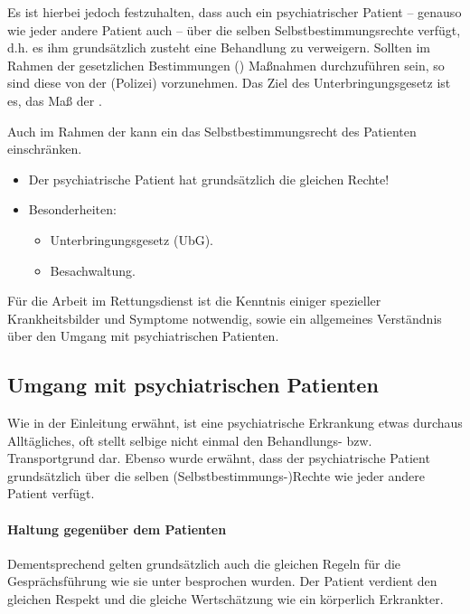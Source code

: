 {%
Es ist hierbei jedoch festzuhalten, dass auch ein psychiatrischer Patient -- genauso wie jeder andere
Patient auch -- über die selben Selbstbestimmungsrechte
verfügt, d.h. es ihm grundsätzlich zusteht eine Behandlung
zu verweigern. Sollten im Rahmen der gesetzlichen
Bestimmungen () Maßnahmen
durchzuführen sein, so sind diese von der 
(Polizei) vorzunehmen. Das Ziel des Unterbringungsgesetz
ist es, das Maß der . 

Auch im Rahmen der
 kann ein  das Selbstbestimmungsrecht des
Patienten einschränken. 
}{
\begin{itemize}
  \item Der psychiatrische Patient hat grundsätzlich die gleichen Rechte!
  \item Besonderheiten:
  \begin{itemize}
    \item Unterbringungsgesetz (UbG).
    \item Besachwaltung.
  \end{itemize}
\end{itemize}
}{}{}{}






Für die Arbeit im Rettungsdienst ist die Kenntnis einiger
spezieller Krankheitsbilder und Symptome notwendig, sowie
ein allgemeines Verständnis über den Umgang mit
psychiatrischen Patienten.

\subsection{Umgang mit psychiatrischen Patienten}

Wie in der Einleitung erwähnt, ist eine psychiatrische
Erkrankung etwas durchaus Alltägliches, oft stellt selbige
nicht einmal den Behandlungs- bzw. Transportgrund dar.
Ebenso wurde erwähnt, dass der psychiatrische Patient
grundsätzlich über die selben (Selbstbestimmungs-)Rechte
wie jeder andere Patient verfügt. 

\paragraph{Haltung gegenüber dem Patienten} Dementsprechend
gelten grundsätzlich auch die gleichen Regeln für die Gesprächsführung wie sie unter
 besprochen wurden. Der
Patient verdient den gleichen Respekt und die gleiche
Wertschätzung wie ein körperlich Erkrankter.

